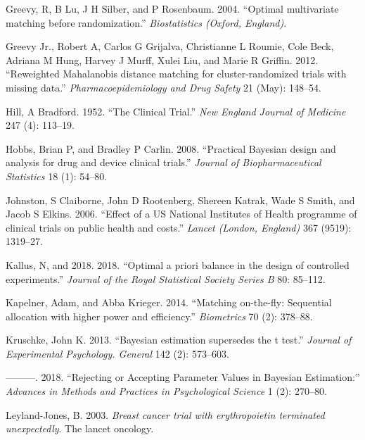 \documentclass[12pt,oneside]{book}
\newlength{\li}\setlength{\li}{14.48pt}
\newlength{\di}\setlength{\di}{-3.5mm}
\theoremstyle{definition}
\theoremstyle{definition}
\theoremstyle{definition}
\theoremstyle{remark}
\begin{document}
\leavevmode\hypertarget{ref-Greevy:2004ke}{}%
Greevy, R, B Lu, J H Silber, and P Rosenbaum. 2004. ``Optimal
multivariate matching before randomization.'' \emph{Biostatistics
(Oxford, England)}.

\leavevmode\hypertarget{ref-GreevyJr:2012hp}{}%
Greevy Jr., Robert A, Carlos G Grijalva, Christianne L Roumie, Cole
Beck, Adriana M Hung, Harvey J Murff, Xulei Liu, and Marie R Griffin.
2012. ``Reweighted Mahalanobis distance matching for cluster-randomized
trials with missing data.'' \emph{Pharmacoepidemiology and Drug Safety}
21 (May): 148--54.

\leavevmode\hypertarget{ref-Hill:1952hc}{}%
Hill, A Bradford. 1952. ``The Clinical Trial.'' \emph{New England
Journal of Medicine} 247 (4): 113--19.

\leavevmode\hypertarget{ref-Hobbs:2008ce}{}%
Hobbs, Brian P, and Bradley P Carlin. 2008. ``Practical Bayesian design
and analysis for drug and device clinical trials.'' \emph{Journal of
Biopharmaceutical Statistics} 18 (1): 54--80.

\leavevmode\hypertarget{ref-Johnston:2006ju}{}%
Johnston, S Claiborne, John D Rootenberg, Shereen Katrak, Wade S Smith,
and Jacob S Elkins. 2006. ``Effect of a US National Institutes of Health
programme of clinical trials on public health and costs.'' \emph{Lancet
(London, England)} 367 (9519): 1319--27.

\leavevmode\hypertarget{ref-Kallus:2018um}{}%
Kallus, N, and 2018. 2018. ``Optimal a priori balance in the design of
controlled experiments.'' \emph{Journal of the Royal Statistical Society
Series B} 80: 85--112.

\leavevmode\hypertarget{ref-Kapelner:2014cu}{}%
Kapelner, Adam, and Abba Krieger. 2014. ``Matching on-the-fly:
Sequential allocation with higher power and efficiency.''
\emph{Biometrics} 70 (2): 378--88.

\leavevmode\hypertarget{ref-Kruschke:2013jy}{}%
Kruschke, John K. 2013. ``Bayesian estimation supersedes the t test.''
\emph{Journal of Experimental Psychology. General} 142 (2): 573--603.

\leavevmode\hypertarget{ref-Kruschke:2018bz}{}%
---------. 2018. ``Rejecting or Accepting Parameter Values in Bayesian
Estimation:'' \emph{Advances in Methods and Practices in Psychological
Science} 1 (2): 270--80.

\leavevmode\hypertarget{ref-LeylandJones:2003kt}{}%
Leyland-Jones, B. 2003. \emph{Breast cancer trial with erythropoietin
terminated unexpectedly}. The lancet oncology.
\end{document}
